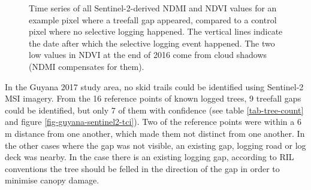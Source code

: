 \documentclass[a4paper,12pt]{scrbook}
\begin{document}
\begin{figure}
\begin{subfigure}[b]{0.45\textwidth}
  \end{subfigure}
  \caption{Time series of all Sentinel-2-derived \ac{NDMI} and \ac{NDVI} values for an example pixel where a treefall gap appeared, compared to a control pixel where no selective logging happened. The vertical lines indicate the date after which the selective logging event happened. The two low values in \ac{NDVI} at the end of 2016 come from cloud shadows (\ac{NDMI} compensates for them).}
  \label{fig-guyana-ts-ndmi}
\end{figure}

In the Guyana 2017 study area, no skid trails could be identified using Sentinel-2 \ac{MSI} imagery. From the 16 reference points of known logged trees, 9 treefall gaps could be identified, but only 7 of them with confidence (see table \ref{tab-tree-count} and figure \ref{fig-guyana-sentinel2-tci}). Two of the reference points were within a 6 m distance from one another, which made them not distinct from one another. In the other cases where the gap was not visible, an existing gap, logging road or log deck was nearby. In the case there is an existing logging gap, according to \ac{RIL} conventions the tree should be felled in the direction of the gap in order to minimise canopy damage.

\begin{table}
  \caption{Change in vegetation index magnitude after a known logging event in the Guyana 2017 study area. Affected pixels are contiguous pixels with visually apparent change less than 75 m away from the location of known logged trees, control are four pixels 106 m away from each location of a known logged tree. Errors are 95\% confidence intervals.}
  \label{tab-vi-magnitudes}
\end{table}
\end{document}

